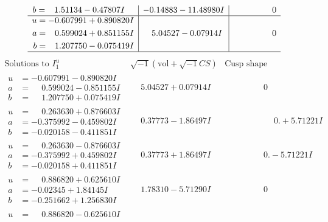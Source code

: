 \documentclass[1p]{elsarticle_modified}
\theoremstyle{definition}
\newcommand{\I}{\sqrt{-1}}
\begin{document}
$$\begin{array}{c|c|c}
\begin{aligned}
b &= \phantom{-}1.51134 - 0.47807 I\end{aligned}
 & -0.14883 - 11.48980 I & \phantom{-0.000000 } 0 \\ \hline\begin{aligned}
u &= -0.607991 + 0.890820 I \\
a &= \phantom{-}0.599024 + 0.851155 I \\
b &= \phantom{-}1.207750 - 0.075419 I\end{aligned}
 & \phantom{-}5.04527 - 0.07914 I & \phantom{-0.000000 } 0\\
 \hline 
 \end{array}$$\newpage$$\begin{array}{c|c|c}  
\text{Solutions to }I^u_{1}& \I (\text{vol} + \sqrt{-1}CS) & \text{Cusp shape}\\
 \hline 
\begin{aligned}
u &= -0.607991 - 0.890820 I \\
a &= \phantom{-}0.599024 - 0.851155 I \\
b &= \phantom{-}1.207750 + 0.075419 I\end{aligned}
 & \phantom{-}5.04527 + 0.07914 I & \phantom{-0.000000 } 0 \\ \hline\begin{aligned}
u &= \phantom{-}0.263630 + 0.876603 I \\
a &= -0.375992 - 0.459802 I \\
b &= -0.020158 - 0.411851 I\end{aligned}
 & \phantom{-}0.37773 - 1.86497 I & \phantom{-0.000000 -}0. + 5.71221 I \\ \hline\begin{aligned}
u &= \phantom{-}0.263630 - 0.876603 I \\
a &= -0.375992 + 0.459802 I \\
b &= -0.020158 + 0.411851 I\end{aligned}
 & \phantom{-}0.37773 + 1.86497 I & \phantom{-0.000000 } 0. - 5.71221 I \\ \hline\begin{aligned}
u &= \phantom{-}0.886820 + 0.625610 I \\
a &= -0.02345 + 1.84145 I \\
b &= -0.251662 + 1.256830 I\end{aligned}
 & \phantom{-}1.78310 - 5.71290 I & \phantom{-0.000000 } 0 \\ \hline\begin{aligned}
u &= \phantom{-}0.886820 - 0.625610 I \\

\end{aligned}
\end{array}$$
\end{document}
